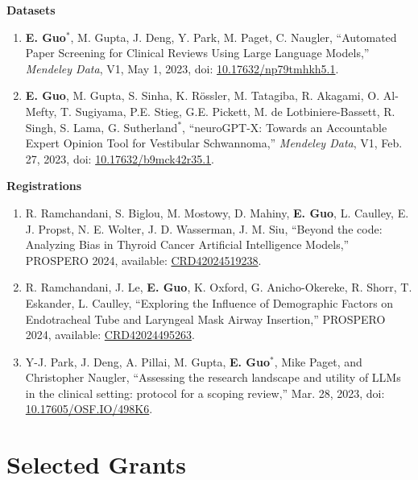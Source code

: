 \documentclass{article}
\begin{document}
\textbf{Datasets} \vspace{.5em}

\begin{enumerate}
    \item \textbf{E. Guo}$^*$, M. Gupta, J. Deng, Y. Park, M. Paget, C. Naugler, ``Automated Paper Screening for Clinical Reviews Using Large Language Models,'' \textit{Mendeley Data}, V1, May 1, 2023, doi: \href{https://doi.org/10.17632/np79tmhkh5.1}{10.17632/np79tmhkh5.1}.
    \item \textbf{E. Guo}, M. Gupta, S. Sinha, K. R\"ossler, M. Tatagiba, R. Akagami, O. Al-Mefty, T. Sugiyama, P.E. Stieg, G.E. Pickett, M. de Lotbiniere-Bassett, R. Singh, S. Lama, G. Sutherland$^*$, ``neuroGPT-X: Towards an Accountable Expert Opinion Tool for Vestibular Schwannoma,'' \textit{Mendeley Data}, V1, Feb. 27, 2023, doi: \href{https://doi.org/10.17632/b9mck42r35.1}{10.17632/b9mck42r35.1}.
\end{enumerate} \vspace{1em}

\textbf{Registrations} \vspace{.5em}

\begin{enumerate}
    \item R. Ramchandani, S. Biglou, M. Mostowy, D. Mahiny, \textbf{E. Guo}, L. Caulley, E. J. Propst, N. E. Wolter, J. D. Wasserman, J. M. Siu, ``Beyond the code: Analyzing Bias in Thyroid Cancer Artificial Intelligence Models,'' PROSPERO 2024, available: \href{https://www.crd.york.ac.uk/prospero/display_record.php?ID=CRD42024519238}{CRD42024519238}.
    \item R. Ramchandani, J. Le, \textbf{E. Guo}, K. Oxford, G. Anicho-Okereke, R. Shorr, T. Eskander, L. Caulley, ``Exploring the Influence of Demographic Factors on Endotracheal Tube and Laryngeal Mask Airway Insertion,'' PROSPERO 2024, available: \href{https://www.crd.york.ac.uk/prospero/display_record.php?ID=CRD42024495263}{CRD42024495263}.
    \item Y-J. Park, J. Deng, A. Pillai, M. Gupta, \textbf{E. Guo}$^*$, Mike Paget, and Christopher Naugler, ``Assessing the research landscape and utility of LLMs in the clinical setting: protocol for a scoping review,'' Mar. 28, 2023, doi: \href{https://osf.io/498k6}{10.17605/OSF.IO/498K6}.
\end{enumerate}


\section*{\textcolor{my_colour}{Selected Grants} }
\vspace{-.25em} \hrulefill \vspace{.25em}
\end{document}
